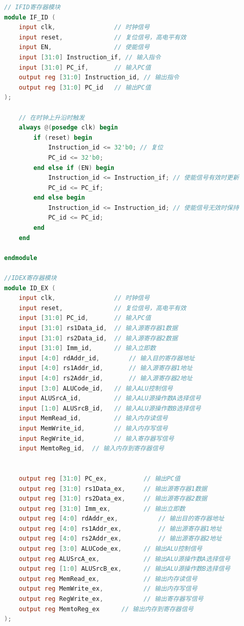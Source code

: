 \documentclass[12pt,hyperref,a4paper,UTF8]{ctexart}
\begin{document}
\begin{lstlisting}[language=Verilog,caption=各级流水线寄存器]
// IFID寄存器模块
module IF_ID (
    input clk,                // 时钟信号
    input reset,              // 复位信号，高电平有效
    input EN,                 // 使能信号
    input [31:0] Instruction_if, // 输入指令
    input [31:0] PC_if,       // 输入PC值
    output reg [31:0] Instruction_id, // 输出指令
    output reg [31:0] PC_id   // 输出PC值
);

    // 在时钟上升沿时触发
    always @(posedge clk) begin
        if (reset) begin
            Instruction_id <= 32'b0; // 复位
            PC_id <= 32'b0;          
        end else if (EN) begin
            Instruction_id <= Instruction_if; // 使能信号有效时更新
            PC_id <= PC_if;                   
        end else begin
            Instruction_id <= Instruction_id; // 使能信号无效时保持
            PC_id <= PC_id;                  
        end
    end

endmodule

//IDEX寄存器模块
module ID_EX (
    input clk,                // 时钟信号
    input reset,              // 复位信号，高电平有效
    input [31:0] PC_id,       // 输入PC值
    input [31:0] rs1Data_id,  // 输入源寄存器1数据
    input [31:0] rs2Data_id,  // 输入源寄存器2数据
    input [31:0] Imm_id,      // 输入立即数
    input [4:0] rdAddr_id,        // 输入目的寄存器地址
    input [4:0] rs1Addr_id,       // 输入源寄存器1地址
    input [4:0] rs2Addr_id,       // 输入源寄存器2地址
    input [3:0] ALUCode_id,   // 输入ALU控制信号
    input ALUSrcA_id,         // 输入ALU源操作数A选择信号
    input [1:0] ALUSrcB_id,   // 输入ALU源操作数B选择信号
    input MemRead_id,         // 输入内存读信号
    input MemWrite_id,        // 输入内存写信号
    input RegWrite_id,        // 输入寄存器写信号
    input MemtoReg_id,  // 输入内存到寄存器信号


    output reg [31:0] PC_ex,          // 输出PC值
    output reg [31:0] rs1Data_ex,     // 输出源寄存器1数据
    output reg [31:0] rs2Data_ex,     // 输出源寄存器2数据
    output reg [31:0] Imm_ex,         // 输出立即数
    output reg [4:0] rdAddr_ex,           // 输出目的寄存器地址
    output reg [4:0] rs1Addr_ex,          // 输出源寄存器1地址
    output reg [4:0] rs2Addr_ex,          // 输出源寄存器2地址
    output reg [3:0] ALUCode_ex,      // 输出ALU控制信号
    output reg ALUSrcA_ex,            // 输出ALU源操作数A选择信号
    output reg [1:0] ALUSrcB_ex,      // 输出ALU源操作数B选择信号
    output reg MemRead_ex,            // 输出内存读信号
    output reg MemWrite_ex,           // 输出内存写信号
    output reg RegWrite_ex,           // 输出寄存器写信号
    output reg MemtoReg_ex      // 输出内存到寄存器信号
);


\end{lstlisting}
\end{document}

